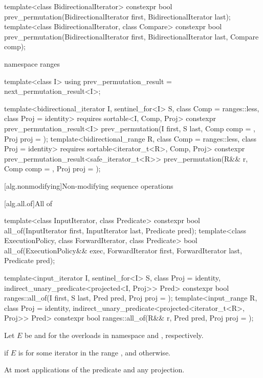 \begin{codeblock}
{  template<class BidirectionalIterator>
    constexpr bool prev_permutation(BidirectionalIterator first,
                                    BidirectionalIterator last);
  template<class BidirectionalIterator, class Compare>
    constexpr bool prev_permutation(BidirectionalIterator first,
                                    BidirectionalIterator last, Compare comp);

  namespace ranges {
    template<class I>
    using prev_permutation_result = next_permutation_result<I>;

    template<bidirectional_iterator I, sentinel_for<I> S, class Comp = ranges::less,
             class Proj = identity>
      requires sortable<I, Comp, Proj>
      constexpr prev_permutation_result<I>
        prev_permutation(I first, S last, Comp comp = {}, Proj proj = {});
    template<bidirectional_range R, class Comp = ranges::less,
             class Proj = identity>
      requires sortable<iterator_t<R>, Comp, Proj>
      constexpr prev_permutation_result<safe_iterator_t<R>>
        prev_permutation(R&& r, Comp comp = {}, Proj proj = {});
  }
}
\end{codeblock}

[alg.nonmodifying]{Non-modifying sequence operations}

[alg.all.of]{All of}

%
\begin{itemdecl}
template<class InputIterator, class Predicate>
  constexpr bool all_of(InputIterator first, InputIterator last, Predicate pred);
template<class ExecutionPolicy, class ForwardIterator, class Predicate>
  bool all_of(ExecutionPolicy&& exec, ForwardIterator first, ForwardIterator last,
              Predicate pred);

template<input_iterator I, sentinel_for<I> S, class Proj = identity,
         indirect_unary_predicate<projected<I, Proj>> Pred>
  constexpr bool ranges::all_of(I first, S last, Pred pred, Proj proj = {});
template<input_range R, class Proj = identity,
         indirect_unary_predicate<projected<iterator_t<R>, Proj>> Pred>
  constexpr bool ranges::all_of(R&& r, Pred pred, Proj proj = {});
\end{itemdecl}

\begin{itemdescr}
\pnum
Let $E$ be  and 
for the overloads in namespace  and , respectively.

\pnum
\returns
{} if $E$ is 
for some iterator  in the range , and
 otherwise.

\pnum
\complexity
At most  applications of the predicate and any projection.
\end{itemdescr}

